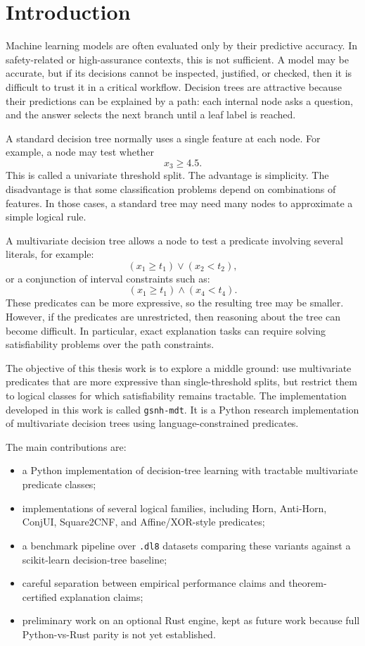 \documentclass[11pt,a4paper]{article}
\begin{document}
\tableofcontents
\newpage

\section{Introduction}

Machine learning models are often evaluated only by their predictive accuracy. In safety-related or high-assurance contexts, this is not sufficient. A model may be accurate, but if its decisions cannot be inspected, justified, or checked, then it is difficult to trust it in a critical workflow. Decision trees are attractive because their predictions can be explained by a path: each internal node asks a question, and the answer selects the next branch until a leaf label is reached.

A standard decision tree normally uses a single feature at each node. For example, a node may test whether
\[
    x_3 \geq 4.5.
\]
This is called a univariate threshold split. The advantage is simplicity. The disadvantage is that some classification problems depend on combinations of features. In those cases, a standard tree may need many nodes to approximate a simple logical rule.

A multivariate decision tree allows a node to test a predicate involving several literals, for example:
\[
    (x_1 \geq t_1) \lor (x_2 < t_2),
\]
or a conjunction of interval constraints such as:
\[
    (x_1 \geq t_1) \land (x_4 < t_4).
\]
These predicates can be more expressive, so the resulting tree may be smaller. However, if the predicates are unrestricted, then reasoning about the tree can become difficult. In particular, exact explanation tasks can require solving satisfiability problems over the path constraints.

The objective of this thesis work is to explore a middle ground: use multivariate predicates that are more expressive than single-threshold splits, but restrict them to logical classes for which satisfiability remains tractable. The implementation developed in this work is called \texttt{gsnh-mdt}. It is a Python research implementation of multivariate decision trees using language-constrained predicates.

The main contributions are:
\begin{itemize}
    \item a Python implementation of decision-tree learning with tractable multivariate predicate classes;
    \item implementations of several logical families, including Horn, Anti-Horn, ConjUI, Square2CNF, and Affine/XOR-style predicates;
    \item a benchmark pipeline over \texttt{.dl8} datasets comparing these variants against a scikit-learn decision-tree baseline;
    \item careful separation between empirical performance claims and theorem-certified explanation claims;
    \item preliminary work on an optional Rust engine, kept as future work because full Python-vs-Rust parity is not yet established.
\end{itemize}
\end{document}
